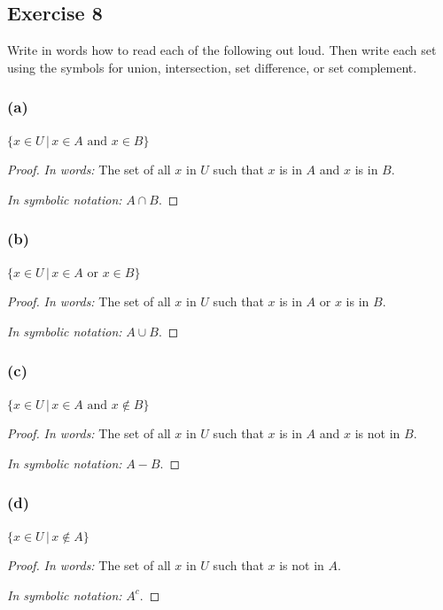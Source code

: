 \documentclass[14pt]{extarticle}
\begin{document}
\subsection{Exercise 8}
Write in words how to read each of the following out loud. Then write each set using the symbols for union, 
intersection, set difference, or set complement.

\subsubsection{(a)}
\(\{x \in U \, | \, x \in A \text{ and } x \in B\}\)

\begin{proof}
{\it In words:} The set of all $x$ in $U$ such that $x$ is in $A$ and $x$ is in $B$.

{\it In symbolic notation:} \(A \cap B\).
\end{proof}

\subsubsection{(b)}
\(\{x \in U \, | \, x \in A \text{ or } x \in B\}\)

\begin{proof}
{\it In words:} The set of all $x$ in $U$ such that $x$ is in $A$ or $x$ is in $B$.

{\it In symbolic notation:} \(A \cup B\).
\end{proof}

\subsubsection{(c)}
\(\{x \in U \, | \, x \in A \text{ and } x \notin B\}\)

\begin{proof}
{\it In words:} The set of all $x$ in $U$ such that $x$ is in $A$ and $x$ is not in $B$.

{\it In symbolic notation:} \(A - B\).
\end{proof}

\subsubsection{(d)}
\(\{x \in U \, | \, x \notin A\}\)

\begin{proof}
{\it In words:} The set of all $x$ in $U$ such that $x$ is not in $A$.

{\it In symbolic notation:} \(A^c\).
\end{proof}
\end{document}
